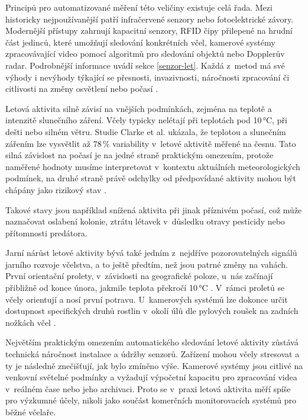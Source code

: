 Principů pro automatizované měření této veličiny existuje celá řada. Mezi historicky nejpoužívanější patří infračervené senzory nebo fotoelektrické závory. Modernější přístupy zahrnují kapacitní senzory, RFID čipy přilepené na hrudní část jedinců, které umožňují sledování konkrétních včel, kamerové systémy zpracovávající video pomocí algoritmů pro sledování objektů nebo Dopplerův radar. Podrobnější informace uvádí sekce \ref{senzor-let}. Každá z~metod má své výhody i nevýhody týkající se přesnosti, invazivnosti, náročnosti zpracování či citlivosti na změny osvětlení nebo počasí \cite{Williams2023}.

Letová aktivita silně závisí na vnějších podmínkách, zejména na teplotě a intenzitě slunečního záření. Včely typicky nelétají při teplotách pod 10\,°C, při dešti nebo silném větru. Studie Clarke et al. \cite{Clarke2018} ukázala, že teplotou a slunečním zářením lze vysvětlit až 78\,\% variability v~letové aktivitě měřené na česnu. Tato silná závislost na počasí je na jedné straně praktickým omezením, protože naměřené hodnoty musíme interpretovat v~kontextu aktuálních meteorologických podmínek, na druhé straně právě odchylky od předpovídané aktivity mohou být chápány jako rizikový stav \cite{Meikle2015}.

Takové stavy jsou například snížená aktivita při jinak příznivém počasí, což může naznačovat oslabení kolonie, ztrátu létavek v~důsledku otravy pesticidy nebo přítomnosti predátora.

Jarní nárůst letové aktivity bývá také jedním z~nejdříve pozorovatelných signálů jarního rozvoje včelstva, a to ještě předtím, než jsou patrné změny na vahách. První orientační prolety, v~závislosti na geografické poloze, u~nás začínají přibližně od konce února, jakmile teplota překročí 10\,°C \cite{beeinfo}. V~rámci proletů se včely orientují a nosí první potravu. U~kamerových systémů lze dokonce určit dostupnost specifických druhů rostlin v~okolí úlů dle pylových roušek na zadních nožkách včel \cite{Cecchi}.

Největším praktickým omezením automatického sledování letové aktivity zůstává technická náročnost instalace a údržby senzorů. Zařízení mohou včely stresovat a ty je následně znečišťují, jak bylo zmíněno výše. Kamerové systémy jsou citlivé na venkovní světelné podmínky a vyžadují výpočetní kapacitu pro zpracování videa v~reálném čase nebo jeho archivaci. Proto se v~praxi letová aktivita měří spíše pro výzkumné účely, nikoli jako součást komerčních monitorovacích systémů pro běžné včelaře.

